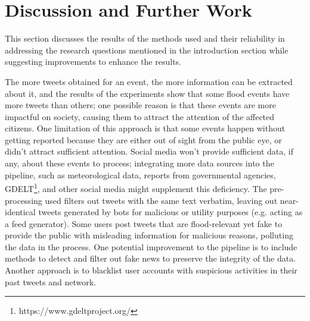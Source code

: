 \chapter{Discussion and Further Work}\label{sec:discussion_and_further_work}

This section discusses the results of the methods used and their reliability in addressing the
research questions mentioned in the introduction section while suggesting improvements to enhance
the results.

The more tweets obtained for an event, the more information can be extracted about it, and the
results of the experiments show that some flood events have more tweets than others; one possible
reason is that these events are more impactful on society, causing them to attract the attention of
the affected citizens. One limitation of this approach is that some events happen without getting
reported because they are either out of sight from the public eye, or didn't attract sufficient
attention. Social media won't provide sufficient data, if any, about these events to process;
integrating more data sources into the pipeline, such as meteorological data, reports from
governmental agencies, \ac{GDELT}\footnote{https://www.gdeltproject.org/}, and other social media
might supplement this deficiency. The pre-processing used filters out tweets with the same text
verbatim, leaving out near-identical tweets generated by bots for malicious or utility purposes (e.g. acting
as a feed generator). Some users post tweets that are flood-relevant yet fake to provide the public
with misleading information for malicious reasons, polluting the data in the process. One potential
improvement to the pipeline is to include methods to detect and filter out fake news to preserve the
integrity of the data. Another approach is to blacklist user accounts with suspicious activities in
their past tweets and network. 

